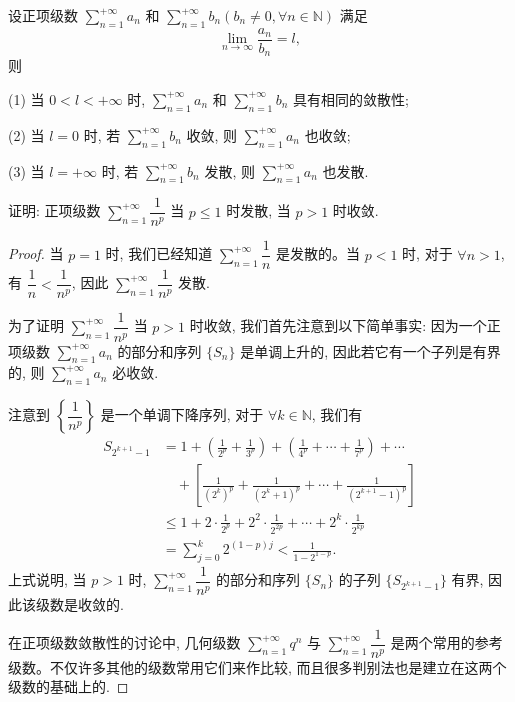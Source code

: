\begin{corollary}\label{corollary:ma-9-source-22}
设正项级数 $\sum\limits_{n=1}^{+\infty}a_n$ 和 $\sum\limits_{n=1}^{+\infty}b_n(b_n\neq0,\forall n\in\mathbb N)$ 满足
\[
  \lim_{n\to\infty}\frac{a_n}{b_n}=l,
\]
则

(1) 当 $0<l<+\infty$ 时, $\sum\limits_{n=1}^{+\infty}a_n$ 和 $\sum\limits_{n=1}^{+\infty}b_n$ 具有相同的敛散性;

(2) 当 $l=0$ 时, 若 $\sum\limits_{n=1}^{+\infty}b_n$ 收敛, 则 $\sum\limits_{n=1}^{+\infty}a_n$ 也收敛;

(3) 当 $l=+\infty$ 时, 若 $\sum\limits_{n=1}^{+\infty}b_n$ 发散, 则 $\sum\limits_{n=1}^{+\infty}a_n$ 也发散.
\end{corollary}


\begin{example}\label{example:ma-9-2-1}
证明: 正项级数 $\sum\limits_{n=1}^{+\infty}\dfrac1{n^p}$ 当 $p\leq1$ 时发散, 当 $p>1$ 时收敛.
\end{example}


\begin{proof}
当 $p=1$ 时, 我们已经知道 $\sum\limits_{n=1}^{+\infty}\dfrac1n$ 是发散的。当 $p<1$ 时, 对于 $\forall n>1$, 有 $\dfrac1n<\dfrac1{n^p}$, 因此 $\sum\limits_{n=1}^{+\infty}\dfrac1{n^p}$ 发散.

为了证明 $\sum\limits_{n=1}^{+\infty}\dfrac1{n^p}$ 当 $p>1$ 时收敛, 我们首先注意到以下简单事实: 因为一个正项级数 $\sum\limits_{n=1}^{+\infty}a_n$ 的部分和序列 $\{S_n\}$ 是单调上升的, 因此若它有一个子列是有界的, 则 $\sum\limits_{n=1}^{+\infty}a_n$ 必收敛.

注意到 $\left\{\dfrac1{n^p}\right\}$ 是一个单调下降序列, 对于 $\forall k\in\mathbb N$, 我们有
\[
\begin{aligned}
  S_{2^{k+1}-1}
  &=1+\left(\frac1{2^p}+\frac1{3^p}\right)
    +\left(\frac1{4^p}+\cdots+\frac1{7^p}\right)+\cdots\\
  &\quad+\left[\frac1{(2^k)^p}+\frac1{(2^k+1)^p}+\cdots+\frac1{(2^{k+1}-1)^p}\right]\\
  &\leq1+2\cdot\frac1{2^p}+2^2\cdot\frac1{2^{2p}}+\cdots+2^k\cdot\frac1{2^{kp}}\\
  &=\sum_{j=0}^k2^{(1-p)j}<\frac1{1-2^{1-p}}.
\end{aligned}
\]
上式说明, 当 $p>1$ 时, $\sum\limits_{n=1}^{+\infty}\dfrac1{n^p}$ 的部分和序列 $\{S_n\}$ 的子列 $\{S_{2^{k+1}-1}\}$ 有界, 因此该级数是收敛的.

在正项级数敛散性的讨论中, 几何级数 $\sum\limits_{n=1}^{+\infty}q^n$ 与 $\sum\limits_{n=1}^{+\infty}\dfrac1{n^p}$ 是两个常用的参考级数。不仅许多其他的级数常用它们来作比较, 而且很多判别法也是建立在这两个级数的基础上的.
\end{proof}


